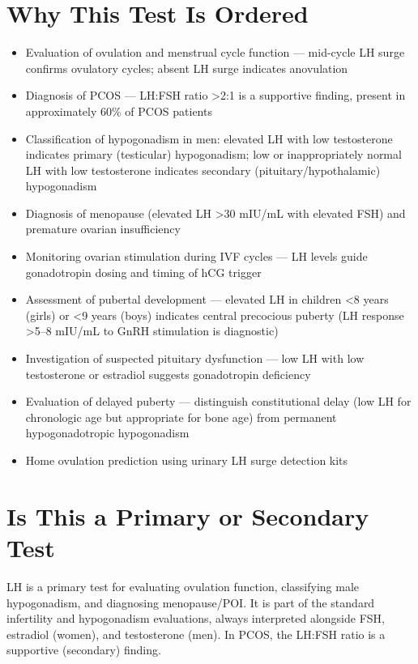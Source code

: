 \section*{Why This Test Is Ordered}
\begin{itemize}
  \item Evaluation of ovulation and menstrual cycle function --- mid-cycle LH surge confirms ovulatory cycles; absent LH surge indicates anovulation
  \item Diagnosis of PCOS --- LH:FSH ratio >2:1 is a supportive finding, present in approximately 60\% of PCOS patients
  \item Classification of hypogonadism in men: elevated LH with low testosterone indicates primary (testicular) hypogonadism; low or inappropriately normal LH with low testosterone indicates secondary (pituitary/hypothalamic) hypogonadism
  \item Diagnosis of menopause (elevated LH >30 mIU/mL with elevated FSH) and premature ovarian insufficiency
  \item Monitoring ovarian stimulation during IVF cycles --- LH levels guide gonadotropin dosing and timing of hCG trigger
  \item Assessment of pubertal development --- elevated LH in children <8 years (girls) or <9 years (boys) indicates central precocious puberty (LH response >5--8 mIU/mL to GnRH stimulation is diagnostic)
  \item Investigation of suspected pituitary dysfunction --- low LH with low testosterone or estradiol suggests gonadotropin deficiency
  \item Evaluation of delayed puberty --- distinguish constitutional delay (low LH for chronologic age but appropriate for bone age) from permanent hypogonadotropic hypogonadism
  \item Home ovulation prediction using urinary LH surge detection kits
\end{itemize}

\section*{Is This a Primary or Secondary Test}
LH is a primary test for evaluating ovulation function, classifying male hypogonadism, and diagnosing menopause/POI. It is part of the standard infertility and hypogonadism evaluations, always interpreted alongside FSH, estradiol (women), and testosterone (men). In PCOS, the LH:FSH ratio is a supportive (secondary) finding.

